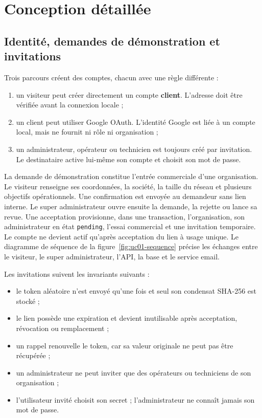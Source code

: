 \section{Conception détaillée}

\subsection{Identité, demandes de démonstration et invitations}

Trois parcours créent des comptes, chacun avec une règle différente :

\begin{enumerate}[leftmargin=8mm]
  \item un visiteur peut créer directement un compte \textbf{client}. L'adresse doit
  être vérifiée avant la connexion locale ;
  \item un client peut utiliser Google OAuth. L'identité Google est liée à un compte
  local, mais ne fournit ni rôle ni organisation ;
  \item un administrateur, opérateur ou technicien est toujours créé par invitation.
  Le destinataire active lui-même son compte et choisit son mot de passe.
\end{enumerate}

La demande de démonstration constitue l'entrée commerciale d'une organisation. Le
visiteur renseigne ses coordonnées, la société, la taille du réseau et plusieurs
objectifs opérationnels. Une confirmation est envoyée au demandeur sans lien
interne. Le super administrateur ouvre ensuite la demande, la rejette ou lance sa
revue. Une acceptation provisionne, dans une transaction, l'organisation, son
administrateur en état \texttt{pending}, l'essai commercial et une invitation
temporaire. Le compte ne devient actif qu'après acceptation du lien à usage unique.
Le diagramme de séquence de la figure~\ref{fig:uc01-sequence} précise les échanges
entre le visiteur, le super administrateur, l'API, la base et le service email.

Les invitations suivent les invariants suivants :

\begin{itemize}[leftmargin=7mm]
  \item le token aléatoire n'est envoyé qu'une fois et seul son condensat SHA-256 est
  stocké ;
  \item le lien possède une expiration et devient inutilisable après acceptation,
  révocation ou remplacement ;
  \item un rappel renouvelle le token, car sa valeur originale ne peut pas être
  récupérée ;
  \item un administrateur ne peut inviter que des opérateurs ou techniciens de son
  organisation ;
  \item l'utilisateur invité choisit son secret ; l'administrateur ne connaît jamais
  son mot de passe.
\end{itemize}

